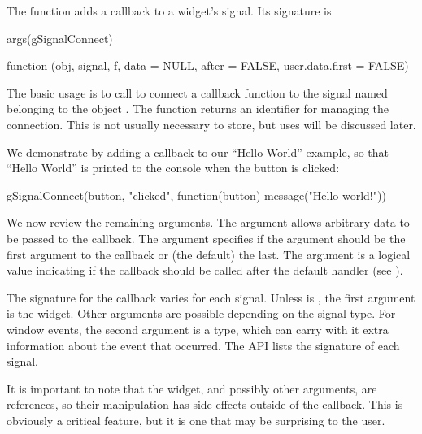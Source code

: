 The  function adds a callback to a widget's
signal. Its signature is
\begin{Schunk}
\begin{Sinput}
 args(gSignalConnect)
\end{Sinput}
\end{Schunk}
\begin{Soutput}
function (obj, signal, f, data = NULL, after = FALSE, 
          user.data.first = FALSE) 
\end{Soutput}
%
The basic usage is to call  to connect a
callback function  to the signal named
 belonging to the object
. The function returns an identifier for
managing the connection. This is not usually necessary to store, but uses will be
discussed later.

We demonstrate  by adding a callback to our ``Hello World''
example, so that ``Hello World'' is printed to the console when the
button is clicked:
\begin{Schunk}
\begin{Sinput}
 gSignalConnect(button, "clicked", 
                function(button) message("Hello world!"))
\end{Sinput}
\end{Schunk}
%

We now review the remaining arguments. The
 argument allows arbitrary data to be
passed to the callback.  The
 argument specifies if the
 argument should be the first argument
to the callback or (the default) the last.  The
 argument is a logical value
indicating if the callback should be called after the default handler
(see ).

The signature for the callback varies for each signal. Unless
 is , the first argument is the
widget. Other arguments are possible depending on the signal type. For
window events, the second argument is a  type, which
can carry with it extra information about the event that occurred. The
\GTK\/ API lists the signature of each signal.

It is important to note that the widget, and possibly other arguments,
are references, so their manipulation has side effects outside of the
callback. This is obviously a critical feature, but it is one that
may be surprising to the \R\/ user.

